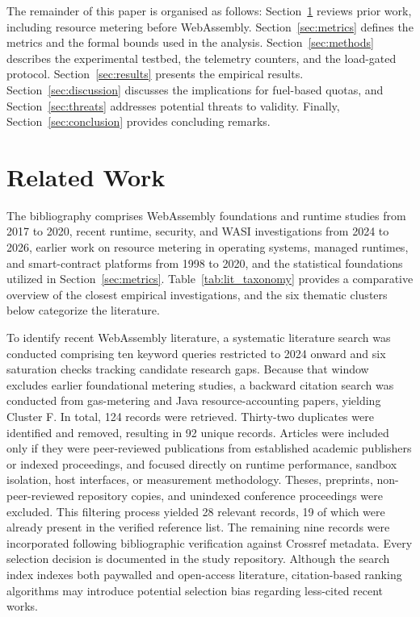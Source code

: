 \documentclass{ws-jcsc}
\begin{document}
The remainder of this paper is organised as follows: Section~\ref{sec:related} reviews prior work, including resource metering before WebAssembly. Section~\ref{sec:metrics} defines the metrics and the formal bounds used in the analysis. Section~\ref{sec:methods} describes the experimental testbed, the telemetry counters, and the load-gated protocol. Section~\ref{sec:results} presents the empirical results. Section~\ref{sec:discussion} discusses the implications for fuel-based quotas, and Section~\ref{sec:threats} addresses potential threats to validity. Finally, Section~\ref{sec:conclusion} provides concluding remarks.

\section{Related Work}
\label{sec:related}
The bibliography comprises WebAssembly foundations and runtime studies from 2017 to 2020, recent runtime, security, and WASI investigations from 2024 to 2026, earlier work on resource metering in operating systems, managed runtimes, and smart-contract platforms from 1998 to 2020, and the statistical foundations utilized in Section~\ref{sec:metrics}. Table~\ref{tab:lit_taxonomy} provides a comparative overview of the closest empirical investigations, and the six thematic clusters below categorize the literature.

To identify recent WebAssembly literature, a systematic literature search was conducted comprising ten keyword queries restricted to 2024 onward and six saturation checks tracking candidate research gaps. Because that window excludes earlier foundational metering studies, a backward citation search was conducted from gas-metering and Java resource-accounting papers, yielding Cluster F. In total, 124 records were retrieved. Thirty-two duplicates were identified and removed, resulting in 92 unique records. Articles were included only if they were peer-reviewed publications from established academic publishers or indexed proceedings, and focused directly on runtime performance, sandbox isolation, host interfaces, or measurement methodology. Theses, preprints, non-peer-reviewed repository copies, and unindexed conference proceedings were excluded. This filtering process yielded 28 relevant records, 19 of which were already present in the verified reference list. The remaining nine records were incorporated following bibliographic verification against Crossref metadata. Every selection decision is documented in the study repository. Although the search index indexes both paywalled and open-access literature, citation-based ranking algorithms may introduce potential selection bias regarding less-cited recent works.
\end{document}
